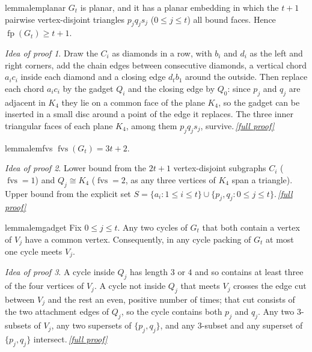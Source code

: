 \documentclass[11pt,a4paper]{article}
\theoremstyle{plain}
\theoremstyle{definition}
\theoremstyle{remark}
\newtheorem*{proofidea}{Idea of proof}
\newcommand{\fullproofref}[1]{\,\hyperref[#1]{\textit{[full proof]}}}
\newcommand{\fvs}{\operatorname{fvs}}
\newcommand{\fp}{\operatorname{fp}}
\newcommand{\Gtt}{G_t}
\begin{document}
\begin{restatable}{lemma}{lemplanar}\label{lem:planar}
$\Gtt$ is planar, and it has a planar embedding in which the $t+1$ pairwise vertex-disjoint triangles $p_jq_js_j$ ($0\le j\le t$) all bound faces. Hence $\fp(\Gtt)\ge t+1$.
\end{restatable}
\begin{proofidea}
Draw the $C_i$ as diamonds in a row, with $b_i$ and $d_i$ as the left and right corners, add the chain edges between consecutive diamonds, a vertical chord $a_ic_i$ inside each diamond and a closing edge $d_tb_1$ around the outside. Then replace each chord $a_ic_i$ by the gadget $Q_i$ and the closing edge by $Q_0$: since $p_j$ and $q_j$ are adjacent in $K_4$ they lie on a common face of the plane $K_4$, so the gadget can be inserted in a small disc around a point of the edge it replaces. The three inner triangular faces of each plane $K_4$, among them $p_jq_js_j$, survive.\fullproofref{pf:planar}
\end{proofidea}

\begin{restatable}{lemma}{lemfvs}\label{lem:fvs}
$\fvs(\Gtt)=3t+2$.
\end{restatable}
\begin{proofidea}
Lower bound from the $2t+1$ vertex-disjoint subgraphs $C_i$ ($\fvs=1$) and $Q_j\cong K_4$ ($\fvs=2$, as any three vertices of $K_4$ span a triangle). Upper bound from the explicit set $S=\{a_i:1\le i\le t\}\cup\{p_j,q_j:0\le j\le t\}$.\fullproofref{pf:fvs}
\end{proofidea}

\begin{restatable}{lemma}{lemgadget}\label{lem:gadget}
Fix $0\le j\le t$. Any two cycles of $\Gtt$ that both contain a vertex of $V_j$ have a common vertex. Consequently, in any cycle packing of $\Gtt$ at most one cycle meets $V_j$.
\end{restatable}
\begin{proofidea}
A cycle inside $Q_j$ has length $3$ or $4$ and so contains at least three of the four vertices of $V_j$. A cycle not inside $Q_j$ that meets $V_j$ crosses the edge cut between $V_j$ and the rest an even, positive number of times; that cut consists of the two attachment edges of $Q_j$, so the cycle contains both $p_j$ and $q_j$. Any two $3$-subsets of $V_j$, any two supersets of $\{p_j,q_j\}$, and any $3$-subset and any superset of $\{p_j,q_j\}$ intersect.\fullproofref{pf:gadget}
\end{proofidea}
\end{document}
